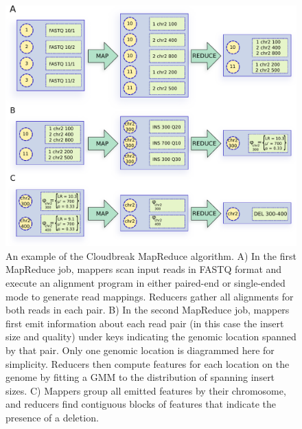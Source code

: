 \documentclass[11pt]{article}
\begin{document}
\clearpage

\begin{figure}[h]
\centering
\includegraphics[width=1\textwidth]{../../figures/cloudbreak_mapred_diagram.pdf}
\caption{An example of the Cloudbreak MapReduce algorithm. A) In the first MapReduce job, mappers scan input reads in FASTQ format and execute an alignment program in either paired-end or single-ended mode to generate read mappings. Reducers gather all alignments for both reads in each pair. B) In the second MapReduce job, mappers first emit information about each read pair (in this case the insert size and quality) under keys indicating the genomic location spanned by that pair. Only one genomic location is diagrammed here for simplicity. Reducers then compute features for each location on the genome by fitting a GMM to the distribution of spanning insert sizes. C) Mappers group all emitted features by their chromosome, and reducers find contiguous blocks of features that indicate the presence of a deletion.}
\label{algorithm_example}
\end{figure}

\clearpage
\end{document}
